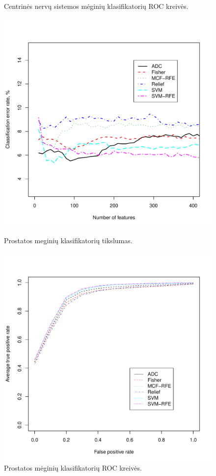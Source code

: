 \begin{figure}[H]
\begin{minipage}[b]{0.5\linewidth}
\caption{Centrinės nervų sistemos mėginių klasifikatorių ROC kreivės.}
\label{fig:roc_cns}
\end{minipage}
\hspace{0.2cm}
\begin{minipage}[b]{0.5\linewidth}
\centering
\includegraphics[width=.9\textwidth]{../bachelor/images/prostate_classification.pdf}
\caption{Prostatos meginių klasifikatorių tikslumas.}
\label{fig:class_prostate}
\end{minipage}
\hspace{0.2cm}
\begin{minipage}[b]{0.5\linewidth}
\centering
\includegraphics[width=.9\textwidth]{../bachelor/images/prostate_roc.pdf}
\caption{Prostatos mėginių klasifikatorių ROC kreivės.}
\label{fig:roc_prostate}
\end{minipage}
\end{figure}
